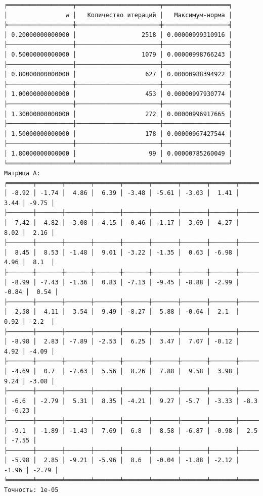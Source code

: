 \documentclass[12pt, a4paper]{report}
\begin{document}
\begin{verbatim}
╒══════════════════╤═══════════════════════╤══════════════════╕
│                w │   Количество итераций │   Максимум-норма │
╞══════════════════╪═══════════════════════╪══════════════════╡
│ 0.20000000000000 │                  2518 │ 0.00000999310916 │
├──────────────────┼───────────────────────┼──────────────────┤
│ 0.50000000000000 │                  1079 │ 0.00000998766243 │
├──────────────────┼───────────────────────┼──────────────────┤
│ 0.80000000000000 │                   627 │ 0.00000988394922 │
├──────────────────┼───────────────────────┼──────────────────┤
│ 1.00000000000000 │                   453 │ 0.00000997930774 │
├──────────────────┼───────────────────────┼──────────────────┤
│ 1.30000000000000 │                   272 │ 0.00000996917665 │
├──────────────────┼───────────────────────┼──────────────────┤
│ 1.50000000000000 │                   178 │ 0.00000967427544 │
├──────────────────┼───────────────────────┼──────────────────┤
│ 1.80000000000000 │                    99 │ 0.00000785260049 │
╘══════════════════╧═══════════════════════╧══════════════════╛
Матрица A: 
╒═══════╤═══════╤═══════╤═══════╤═══════╤═══════╤═══════╤═══════╤═══════╤═══════╕
│ -8.92 │ -1.74 │  4.86 │  6.39 │ -3.48 │ -5.61 │ -3.03 │  1.41 │  3.44 │ -9.75 │
├───────┼───────┼───────┼───────┼───────┼───────┼───────┼───────┼───────┼───────┤
│  7.42 │ -4.82 │ -3.08 │ -4.15 │ -0.46 │ -1.17 │ -3.69 │  4.27 │  8.02 │  2.16 │
├───────┼───────┼───────┼───────┼───────┼───────┼───────┼───────┼───────┼───────┤
│  8.45 │  8.53 │ -1.48 │  9.01 │ -3.22 │ -1.35 │  0.63 │ -6.98 │  4.96 │  8.1  │
├───────┼───────┼───────┼───────┼───────┼───────┼───────┼───────┼───────┼───────┤
│ -8.99 │ -7.43 │ -1.36 │  0.83 │ -7.13 │ -9.45 │ -8.88 │ -2.99 │ -0.84 │  0.54 │
├───────┼───────┼───────┼───────┼───────┼───────┼───────┼───────┼───────┼───────┤
│  2.58 │  4.11 │  3.54 │  9.49 │ -8.27 │  5.88 │ -0.64 │  2.1  │  0.92 │ -2.2  │
├───────┼───────┼───────┼───────┼───────┼───────┼───────┼───────┼───────┼───────┤
│ -8.98 │  2.83 │ -7.89 │ -2.53 │  6.25 │  3.47 │  7.07 │ -0.12 │  4.92 │ -4.09 │
├───────┼───────┼───────┼───────┼───────┼───────┼───────┼───────┼───────┼───────┤
│ -4.69 │  0.7  │ -7.63 │  5.56 │  8.26 │  7.88 │  9.58 │  3.98 │  9.24 │ -3.08 │
├───────┼───────┼───────┼───────┼───────┼───────┼───────┼───────┼───────┼───────┤
│ -6.6  │ -2.79 │  5.31 │  8.35 │ -4.21 │  9.27 │ -5.7  │ -3.33 │ -8.3  │ -6.23 │
├───────┼───────┼───────┼───────┼───────┼───────┼───────┼───────┼───────┼───────┤
│ -9.1  │ -1.89 │ -1.43 │  7.69 │  6.8  │  8.58 │ -6.87 │ -0.98 │  2.5  │ -7.55 │
├───────┼───────┼───────┼───────┼───────┼───────┼───────┼───────┼───────┼───────┤
│ -5.98 │  2.85 │ -9.21 │ -5.96 │  8.6  │ -0.04 │ -1.88 │ -2.12 │ -1.96 │ -2.79 │
╘═══════╧═══════╧═══════╧═══════╧═══════╧═══════╧═══════╧═══════╧═══════╧═══════╛
Точность: 1e-05
\end{verbatim}
\end{document}
